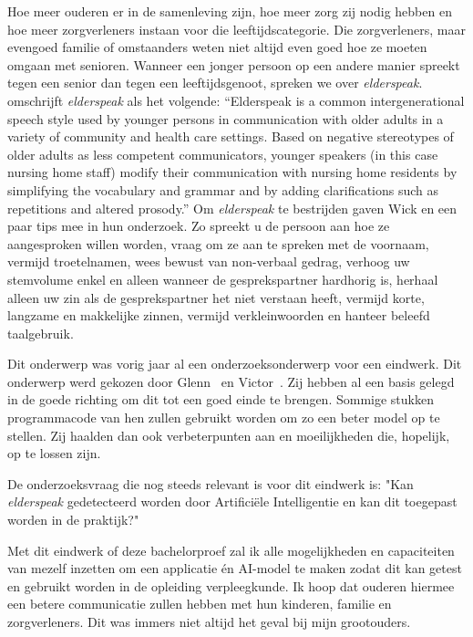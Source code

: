 Hoe meer ouderen er in de samenleving zijn, hoe meer zorg zij nodig hebben en hoe meer zorgverleners instaan voor die leeftijdscategorie.
Die zorgverleners, maar evengoed familie of omstaanders weten niet altijd even goed hoe ze moeten omgaan met senioren.
Wanneer een jonger persoon op een andere manier spreekt tegen een senior dan tegen een leeftijdsgenoot, spreken we over \textit{elderspeak}. \textcite{Williams2011} omschrijft \textit{elderspeak} als het volgende: \enquote{Elderspeak is a common intergenerational speech style used by younger persons in communication with older adults in a variety of community and health care settings. Based on negative stereotypes of older adults as less competent communicators, younger speakers (in this case nursing home staff) modify their communication with nursing home residents by simplifying the vocabulary and grammar and by adding clarifications such as repetitions and altered prosody.} Om \textit{elderspeak} te bestrijden gaven Wick en \textcite{Wick2007} een paar tips mee in hun onderzoek.
Zo spreekt u de persoon aan hoe ze aangesproken willen worden, vraag om ze aan te spreken met de voornaam, vermijd troetelnamen, wees bewust van non-verbaal gedrag, verhoog uw stemvolume enkel en alleen wanneer de gesprekspartner hardhorig is, herhaal alleen uw zin als de gesprekspartner het niet verstaan heeft, vermijd korte, langzame en makkelijke zinnen, vermijd verkleinwoorden en hanteer beleefd taalgebruik.

Dit onderwerp was vorig jaar al een onderzoeksonderwerp voor een eindwerk.
Dit onderwerp werd gekozen door Glenn~\textcite{Beeckman2021} en Victor~\textcite{Standaert2021}.
Zij hebben al een basis gelegd in de goede richting om dit tot een goed einde te brengen.
Sommige stukken programmacode van hen zullen gebruikt worden om zo een beter model op te stellen.
Zij haalden dan ook verbeterpunten aan en moeilijkheden die, hopelijk, op te lossen zijn.

De onderzoeksvraag die nog steeds relevant is voor dit eindwerk is: "Kan \textit{elderspeak} gedetecteerd worden door Artificiële Intelligentie en kan dit toegepast worden in de praktijk?"

Met dit eindwerk of deze bachelorproef zal ik alle mogelijkheden en capaciteiten van mezelf inzetten om een applicatie én AI-model te maken zodat dit kan getest en gebruikt worden in de opleiding verpleegkunde.
Ik hoop dat ouderen hiermee een betere communicatie zullen hebben met hun kinderen, familie en zorgverleners.
Dit was immers niet altijd het geval bij mijn grootouders.


